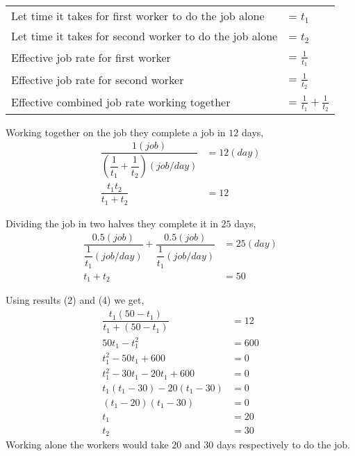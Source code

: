 \begin{solution}
  \begin{tabular}{ll}  
    Let time it takes for first worker to do the job alone  &= $t_1$ \\
    Let time it takes for second worker to do the job alone &= $t_2$ \\
    Effective job rate for first worker               &= $\frac{1}{t_1}$ \\
    Effective job rate for second worker              &= $\frac{1}{t_2}$ \\
    Effective combined job rate working together      &= $\frac{1}{t_1}+\frac{1}{t_2}$
  \end{tabular} 

  Working together on the job they complete a job in $12$ days,
  \begin{align}
	\dfrac{1(job)}
		{\left(\dfrac{1}{t_1}+\dfrac{1}{t_2}\right)(job/day)} &= 12(day) \\
	\dfrac{t_1t_2}{t_1+t_2}                                   &= 12
  \end{align}
  
  Dividing the job in two halves they complete it in $25$ days,
  \begin{align}
    \dfrac{0.5(job)}{\dfrac{1}{t_1}(job/day)}+
    	\dfrac{0.5(job)}{\dfrac{1}{t_1}(job/day)} &= 25(day) \\
    t_1+t_2                                       &= 50
  \end{align}
  
  Using results (2) and (4) we get,
  \begin{align}
	\dfrac{t_1(50-t_1)}{t_1+(50-t_1)} &= 12 \\
    50t_1-t_1^2                     &= 600 \\
    t_1^2-50t_1+600                 &= 0 \\     
    t_1^2-30t_1-20t_1+600           &= 0 \\     
    t_1(t_1-30)-20(t_1-30)          &= 0 \\
    (t_1-20)(t_1-30)                &= 0 \\
    t_1                             &= 20 \\
    t_2                             &= 30
  \end{align}
  Working alone the workers would take $20$ and $30$ days respectively to do the job.

\end{solution}

